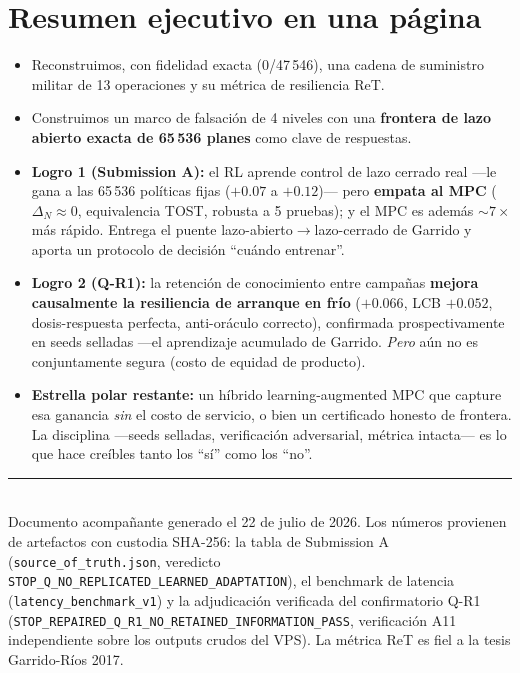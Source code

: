 \documentclass[11pt,a4paper]{article}
\newcommand{\code}[1]{\texttt{#1}}
\begin{document}
\section{Resumen ejecutivo en una página}
\begin{itemize}[nosep]
  \item Reconstruimos, con fidelidad exacta (0/47\,546), una cadena de suministro militar de 13
        operaciones y su métrica de resiliencia ReT.
  \item Construimos un marco de falsación de 4 niveles con una \textbf{frontera de lazo abierto exacta
        de 65\,536 planes} como clave de respuestas.
  \item \textbf{Logro 1 (Submission A):} el RL aprende control de lazo cerrado real —le gana a las
        65\,536 políticas fijas ($+0.07$ a $+0.12$)— pero \textbf{empata al MPC} ($\Delta_N{\approx}0$,
        equivalencia TOST, robusta a 5 pruebas); y el MPC es además ${\sim}7\times$ más rápido. Entrega
        el puente lazo-abierto$\to$lazo-cerrado de Garrido y aporta un protocolo de decisión ``cuándo
        entrenar''.
  \item \textbf{Logro 2 (Q-R1):} la retención de conocimiento entre campañas \textbf{mejora causalmente
        la resiliencia de arranque en frío} ($+0.066$, LCB $+0.052$, dosis-respuesta perfecta,
        anti-oráculo correcto), confirmada prospectivamente en seeds selladas —el aprendizaje acumulado
        de Garrido. \emph{Pero} aún no es conjuntamente segura (costo de equidad de producto).
  \item \textbf{Estrella polar restante:} un híbrido learning-augmented MPC que capture esa ganancia
        \emph{sin} el costo de servicio, o bien un certificado honesto de frontera. La disciplina —seeds
        selladas, verificación adversarial, métrica intacta— es lo que hace creíbles tanto los ``sí''
        como los ``no''.
\end{itemize}

\vfill
\noindent\rule{\linewidth}{0.4pt}\\
{\footnotesize Documento acompañante generado el 22 de julio de 2026. Los números provienen de
artefactos con custodia SHA-256: la tabla de Submission A (\code{source\_of\_truth.json}, veredicto
\code{STOP\_Q\_NO\_REPLICATED\_LEARNED\_ADAPTATION}), el benchmark de latencia
(\code{latency\_benchmark\_v1}) y la adjudicación verificada del confirmatorio Q-R1
(\code{STOP\_REPAIRED\_Q\_R1\_NO\_RETAINED\_INFORMATION\_PASS}, verificación A11 independiente sobre los
outputs crudos del VPS). La métrica ReT es fiel a la tesis Garrido-Ríos 2017.}
\end{document}

